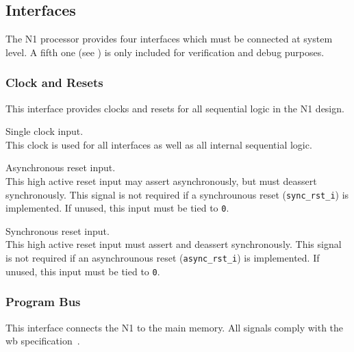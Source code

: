 \subsection{Interfaces}
\label{integration:if}

The N1 processor provides four interfaces which must be connected at system level.
A fifth one (see ) is only included for verification and debug purposes.

\subsubsection{Clock and Resets}
\label{integration:if:clk}
This interface provides clocks and resets for all sequential logic in the N1 design.

\begin{description}[style=nextline]

\item[\texttt{clk\_i}] Single clock input. \\  
  This clock is used for all interfaces as well as all internal sequential logic.

\item[\texttt{async\_rst\_i}] Asynchronous reset input. \\
  This high active reset input may assert asynchronously, but must deassert synchronously.
  This signal is not required if a synchrounous reset (\texttt{sync\_rst\_i}) is implemented.
  If unused, this input must be tied to \texttt{0}.

\item[\texttt{sync\_rst\_i}] Synchronous reset input. \\
  This high active reset input must assert and deassert synchronously.
  This signal is not required if an asynchrounous reset (\texttt{async\_rst\_i}) is implemented.
  If unused, this input must be tied to \texttt{0}.
 
\end{description}

\subsubsection{Program Bus}
\label{integration:if:pbus}
This interface connects the N1 to the main memory.
All signals comply with the \gls{wb} specification~\cite{wishbone}.

